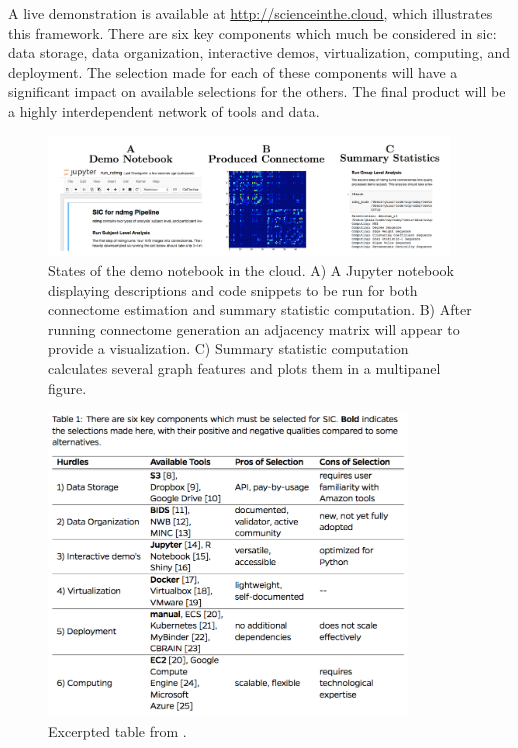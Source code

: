 \documentclass[simplex.tex]{subfiles}
\begin{document}
A live demonstration is available at \href{http://scienceinthe.cloud}{http://scienceinthe.cloud}, which illustrates
this framework. There are six key components which much be considered in sic: data storage, data organization,
interactive demos, virtualization, computing, and deployment. The selection made for each of these components
will have a significant impact on available selections for the others. The final product will be a highly
interdependent network of tools and data.

\begin{figure}[h!]
\begin{cframed}
\centering
\includegraphics[width=0.95\textwidth]{../../figs/sic.png}
\caption{
  States of the demo notebook in the cloud. A) A Jupyter notebook
  displaying descriptions and code snippets to be run for both
  connectome estimation and summary statistic computation. B) After
  running connectome generation an adjacency matrix will appear to
  provide a visualization. C) Summary statistic computation calculates
  several graph features and plots them in a multipanel figure. 
}
\label{fig:sic}
\end{cframed}
\end{figure}

\begin{figure}[h!]
\begin{cframed}
\centering
\includegraphics[width=0.85\textwidth]{../../figs/sicTab.png}
\caption{
  Excerpted table from \cite{kiar2016}.
}
\label{fig:sicTab}
\end{cframed}
\end{figure}
\end{document}

